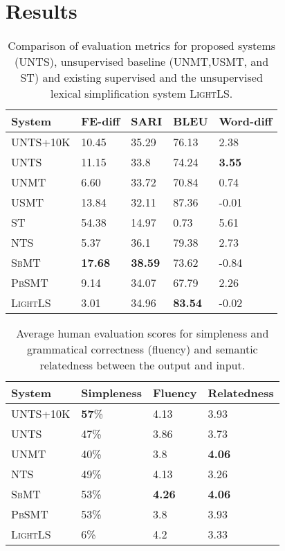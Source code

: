 \documentclass[11pt,a4paper]{article}
\begin{document}
 \section{Results}
\label{sec:result}
\begin{table}
\footnotesize
\begin{tabular}{lllll}
\toprule
\textbf{System} & \textbf{FE-diff} & \textbf{SARI} & \textbf{BLEU} & \textbf{Word-diff} \\
\midrule
\textsc{UNTS}+10K & 10.45 & 35.29 & 76.13 & 2.38 \\ 
\textsc{UNTS} & 11.15 & 33.8 & 74.24 & \textbf{3.55} \\
\midrule
\textsc{UNMT} & 6.60 & 33.72 & 70.84 & 0.74 \\
\textsc{USMT} & 13.84 & 32.11 & 87.36 & -0.01\\
\textsc{ST} & 54.38 & 14.97 & 0.73 & 5.61\\
\midrule
\textsc{NTS} & 5.37 & 36.1 & 79.38 & 2.73 \\
\textsc{SbMT} & \textbf{17.68} & \textbf{38.59} & 73.62 & -0.84 \\
\textsc{PbSMT} & 9.14 & 34.07 & 67.79 & 2.26 \\
\midrule
\textsc{LightLS} & 3.01 & 34.96 & \textbf{83.54} & -0.02 \\ \bottomrule
\end{tabular}
\caption{Comparison of evaluation metrics for proposed systems (\textsc{UNTS}), unsupervised baseline (\textsc{UNMT},\textsc{USMT}, and \textsc{ST}) and existing supervised and the unsupervised lexical simplification system \textsc{LightLS}.}
\label{tab:results} 
\end{table}
\begin{table}[t]
\footnotesize
\begin{tabular}{llll}
\toprule
\textbf{System} & \textbf{Simpleness} & \textbf{Fluency} & \textbf{Relatedness}\\
\midrule
\textsc{UNTS}+10K & \textbf{57}\% & 4.13 & 3.93 \\ 
\textsc{UNTS} & 47\% & 3.86 & 3.73 \\
\midrule
\textsc{UNMT} & 40\% & 3.8 & \textbf{4.06} \\
\midrule
\textsc{NTS} & 49\% & 4.13 & 3.26 \\
\textsc{SbMT} & 53\% & \textbf{4.26} & \textbf{4.06} \\
\textsc{PbSMT} & 53\% & 3.8 & 3.93 \\
\midrule
\textsc{LightLS} & 6\% & 4.2 & 3.33 \\ \bottomrule
\end{tabular}
\caption{Average human evaluation scores for simpleness and grammatical correctness (fluency) and semantic relatedness between the output and input.}
\label{tab:Human} 
\end{table}
\end{document}
